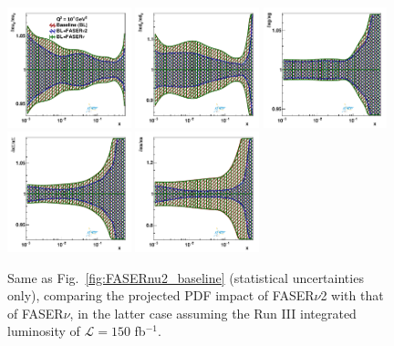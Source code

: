 \begin{figure}[t]
\centering
\includegraphics[width=0.32\textwidth]{plots/proton_fasernu2/FASERv2_vs_FASERv/statOnly_FASERv_q2_10000_pdf_uv_ratio.pdf}
\includegraphics[width=0.32\textwidth]{plots/proton_fasernu2/FASERv2_vs_FASERv/statOnly_FASERv_q2_10000_pdf_dv_ratio.pdf}
\includegraphics[width=0.32\textwidth]{plots/proton_fasernu2/FASERv2_vs_FASERv/statOnly_FASERv_q2_10000_pdf_g_ratio.pdf}\\
\includegraphics[width=0.32\textwidth]{plots/proton_fasernu2/FASERv2_vs_FASERv/statOnly_FASERv_q2_10000_pdf_Sea_ratio.pdf}
\includegraphics[width=0.32\textwidth]{plots/proton_fasernu2/FASERv2_vs_FASERv/statOnly_FASERv_q2_10000_pdf_s_ratio.pdf}
\caption{Same as  Fig.~\ref{fig:FASERnu2_baseline} (statistical uncertainties only), comparing
  the projected PDF impact of FASER$\nu$2 with that of FASER$\nu$, in the latter
  case assuming the Run III integrated
luminosity of $\mathcal{L}=150$ fb$^{-1}$.
}
\label{fig:FASERnu2_vs_FASERnu}
\end{figure}

